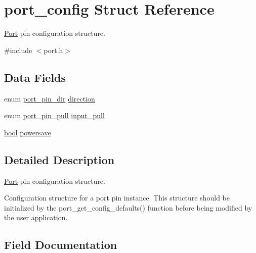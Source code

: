 \hypertarget{structport__config}{}\section{port\+\_\+config Struct Reference}
\label{structport__config}


\mbox{\hyperlink{struct_port}{Port}} pin configuration structure.  




{\ttfamily \#include $<$port.\+h$>$}

\subsection*{Data Fields}
\begin{DoxyCompactItemize}
\item 
enum \mbox{\hyperlink{group__asfdoc__sam0__port__group_gabe12893c067f9b011ece79c1bf1b128a}{port\+\_\+pin\+\_\+dir}} \mbox{\hyperlink{structport__config_a71df9fe8b2cc6b6ba920473cc3783fdd}{direction}}
\item 
enum \mbox{\hyperlink{group__asfdoc__sam0__port__group_ga1f47828261f5b7ac5f864b42981a2004}{port\+\_\+pin\+\_\+pull}} \mbox{\hyperlink{structport__config_a6f6186e550173a51258e1a2167160761}{input\+\_\+pull}}
\item 
\mbox{\hyperlink{group__group__sam0__utils_ga97a80ca1602ebf2303258971a2c938e2}{bool}} \mbox{\hyperlink{structport__config_afbc3e052896051a278a5ad17f6a6e2bb}{powersave}}
\end{DoxyCompactItemize}


\subsection{Detailed Description}
\mbox{\hyperlink{struct_port}{Port}} pin configuration structure. 

Configuration structure for a port pin instance. This structure should be initialized by the port\+\_\+get\+\_\+config\+\_\+defaults() function before being modified by the user application. 

\subsection{Field Documentation}
\mbox{\label{structport__config_a71df9fe8b2cc6b6ba920473cc3783fdd}} 

